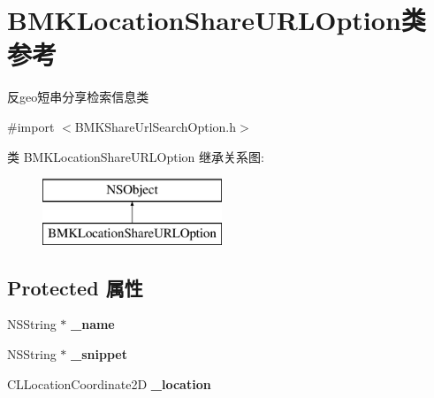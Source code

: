 \hypertarget{interface_b_m_k_location_share_u_r_l_option}{\section{B\+M\+K\+Location\+Share\+U\+R\+L\+Option类 参考}
\label{interface_b_m_k_location_share_u_r_l_option}
}


反geo短串分享检索信息类  




{\ttfamily \#import $<$B\+M\+K\+Share\+Url\+Search\+Option.\+h$>$}

类 B\+M\+K\+Location\+Share\+U\+R\+L\+Option 继承关系图\+:\begin{figure}[H]
\begin{center}
\leavevmode
\includegraphics[height=2.000000cm]{interface_b_m_k_location_share_u_r_l_option}
\end{center}
\end{figure}
\subsection*{Protected 属性}
\begin{DoxyCompactItemize}
\item 
\hypertarget{interface_b_m_k_location_share_u_r_l_option_aa7590ba3b21f55434f5854778974b9c4}{N\+S\+String $\ast$ {\bfseries \+\_\+name}}\label{interface_b_m_k_location_share_u_r_l_option_aa7590ba3b21f55434f5854778974b9c4}

\item 
\hypertarget{interface_b_m_k_location_share_u_r_l_option_a455c7467cf0814dbe3219e7ed596b38a}{N\+S\+String $\ast$ {\bfseries \+\_\+snippet}}\label{interface_b_m_k_location_share_u_r_l_option_a455c7467cf0814dbe3219e7ed596b38a}

\item 
\hypertarget{interface_b_m_k_location_share_u_r_l_option_a67aa843182abf143e68a89d9fbe3441c}{C\+L\+Location\+Coordinate2\+D {\bfseries \+\_\+location}}\label{interface_b_m_k_location_share_u_r_l_option_a67aa843182abf143e68a89d9fbe3441c}

\end{DoxyCompactItemize}
